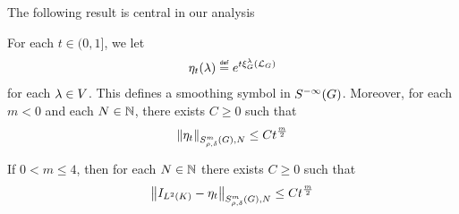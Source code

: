 The following result is central in our analysis

\begin{theorem}
    For each $t \in (0, 1]$,
    we let
    \begin{align*}
        \eta_t(\lambda) \defeq \e^{t \Rep \lambda (\Laplacian)}
    \end{align*}
    for each $\lambda \in \VectorSpace$.
    This defines a smoothing symbol in $\SmoothingSymbols$.
    Moreover, for each $m < 0$ and each $N \in \N$,
    there exists $C \geq 0$ such that
    \begin{align*}
        \SymbolSemiNorm m {\rho, \delta} N {\eta_t} \leq C t^\frac m 2
    \end{align*}

    If $0 < m \leq 4$,
    then for each $N \in \N$
    there exists $C \geq 0$ such that
    \begin{align*}
        \SymbolSemiNorm m {\rho, \delta} N {\Id {\Lebesgue 2 \CompactGroup} - \eta_t} \leq C t^\frac m 2
    \end{align*}
\end{theorem}
